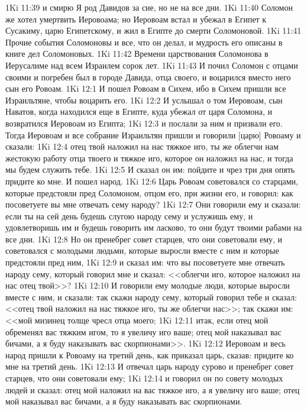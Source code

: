\vs 1Ki 11:39 и смирю Я род Давидов за сие, но не на все дни.
\vs 1Ki 11:40 Соломон же хотел умертвить Иеровоама; но Иеровоам встал и убежал в Египет к Сусакиму, царю Египетскому, и жил в Египте до смерти Соломоновой.
\rsbpar\vs 1Ki 11:41 Прочие события Соломоновы и все, что он делал, и мудрость его описаны в книге дел Соломоновых.
\vs 1Ki 11:42 Времени царствования Соломонова в Иерусалиме над всем Израилем  сорок лет.
\vs 1Ki 11:43 И почил Соломон с отцами своими и погребен был в городе Давида, отца своего, и воцарился вместо него сын его Ровоам.
\vs 1Ki 12:1 И пошел Ровоам в Сихем, ибо в Сихем пришли все Израильтяне, чтобы воцарить его.
\vs 1Ki 12:2 И услышал о том Иеровоам, сын Наватов, когда находился еще в Египте, куда убежал от царя Соломона, и возвратился Иеровоам из Египта;
\vs 1Ki 12:3 и послали за ним и призвали его. Тогда Иеровоам и все собрание Израильтян пришли и говорили [царю] Ровоаму и сказали:
\vs 1Ki 12:4 отец твой наложил на нас тяжкое иго, ты же облегчи нам жестокую работу отца твоего и тяжкое иго, которое он наложил на нас, и тогда мы будем служить тебе.
\vs 1Ki 12:5 И сказал он им: пойдите и чрез три дня опять придите ко мне. И пошел народ.
\vs 1Ki 12:6 Царь Ровоам советовался со старцами, которые предстояли пред Соломоном, отцом его, при жизни его, и говорил: как посоветуете вы мне отвечать сему народу?
\vs 1Ki 12:7 Они говорили ему и сказали: если ты на сей день будешь слугою народу сему и услужишь ему, и удовлетворишь им и будешь говорить им ласково, то они будут твоими рабами на все дни.
\vs 1Ki 12:8 Но он пренебрег совет старцев, что они советовали ему, и советовался с молодыми людьми, которые выросли вместе с ним и которые предстояли пред ним,
\vs 1Ki 12:9 и сказал им: что вы посоветуете мне отвечать народу сему, который говорил мне и сказал: <<облегчи иго, которое наложил на нас отец твой>>?
\vs 1Ki 12:10 И говорили ему молодые люди, которые выросли вместе с ним, и сказали: так скажи народу сему, который говорил тебе и сказал: <<отец твой наложил на нас тяжкое иго, ты же облегчи нас>>; так скажи им: <<мой мизинец толще чресл отца моего;
\vs 1Ki 12:11 итак, если отец мой обременял вас тяжким игом, то я увеличу иго ваше; отец мой наказывал вас бичами, а я буду наказывать вас скорпионами>>.
\vs 1Ki 12:12 Иеровоам и весь народ пришли к Ровоаму на третий день, как приказал царь, сказав: придите ко мне на третий день.
\vs 1Ki 12:13 И отвечал царь народу сурово и пренебрег совет старцев, что они советовали ему;
\vs 1Ki 12:14 и говорил он по совету молодых людей и сказал: отец мой наложил на вас тяжкое иго, а я увеличу иго ваше; отец мой наказывал вас бичами, а я буду наказывать вас скорпионами.
